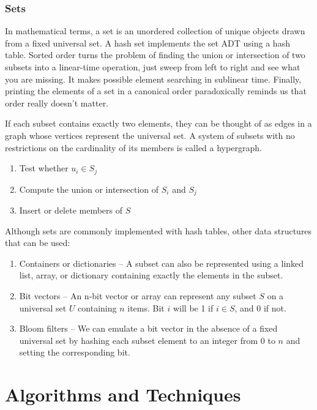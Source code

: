 \documentclass{article}
\begin{document}
    \subsubsection{Sets}
    In mathematical terms, a set is an unordered collection of unique objects drawn from a fixed universal set. A hash set implements the set ADT using a hash table. Sorted order turns the problem of finding the union or intersection of two subsets into a linear-time operation, just sweep from left to right and see what you are missing. It makes possible element searching in sublinear time. Finally, printing the elements of a set in a canonical order paradoxically reminds us that order really doesn’t matter.
     
    If each subset contains exactly two elements, they can be thought of as edges in a graph whose vertices represent the universal set. A system of subsets with no restrictions on the cardinality of its members is called a hypergraph.
    
    \begin{enumerate}
        \item Test whether $u_i \in S_j$
        \item Compute the union or intersection of $S_i$ and $S_j$
        \item Insert or delete members of $S$
    \end{enumerate}
    
    Although sets are commonly implemented with hash tables, other data structures that can be used:
    
    \begin{enumerate}
        \item Containers or dictionaries – A subset can also be represented using a linked list, array, or dictionary containing exactly the elements in the subset.
        \item Bit vectors – An n-bit vector or array can represent any subset $S$ on a universal set $U$ containing $n$ items. Bit $i$ will be 1 if $i \in S$, and $0$ if not.
        \item Bloom filters – We can emulate a bit vector in the absence of a fixed universal set by hashing each subset element to an integer from $0$ to $n$ and setting the corresponding bit.
    \end{enumerate}

\newpage    
\section{Algorithms and Techniques}
\end{document}
